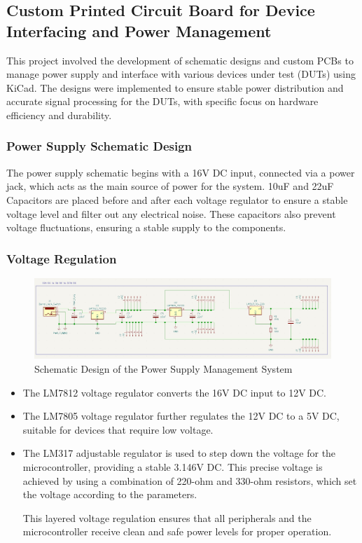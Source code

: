 \documentclass[12pt]{article}
\begin{document}
\subsection{Custom Printed Circuit Board for Device Interfacing and Power Management}
This project involved the development of schematic designs and custom PCBs to
manage power supply and interface with various devices under test (DUTs) using
KiCad. The designs were implemented to ensure stable power distribution and
accurate signal processing for the DUTs, with specific focus on hardware
efficiency and durability.


\subsubsection{Power Supply Schematic Design}
The power supply schematic begins with a 16V DC input, connected via a power
jack, which acts as the main source of power for the system. 10uF and 22uF
Capacitors are placed before and after each voltage regulator to ensure a
stable voltage level and filter out any electrical noise. These capacitors also
prevent voltage fluctuations, ensuring a stable supply to the components.
\break
\subsubsection*{Voltage Regulation}
  \begin{figure}[H]
    \includegraphics[width=\textwidth]{../assets/pcb/image1.jpg}
    \caption{Schematic Design of the Power Supply Management System}
  \end{figure}
\begin{itemize}
  \item The LM7812 voltage regulator converts the 16V DC input to 12V DC.
  \item The LM7805 voltage regulator further regulates the 12V DC to a 5V DC,
    suitable for devices that require low voltage.
  \item The LM317 adjustable regulator is used to step down the voltage for the
    microcontroller, providing a stable 3.146V DC. This precise voltage is
    achieved by using a combination of 220-ohm and 330-ohm resistors, which set
    the voltage according to the parameters.

    This layered voltage regulation ensures that all peripherals and the
    microcontroller receive clean and safe power levels for proper operation.
\end{itemize}
\end{document}
